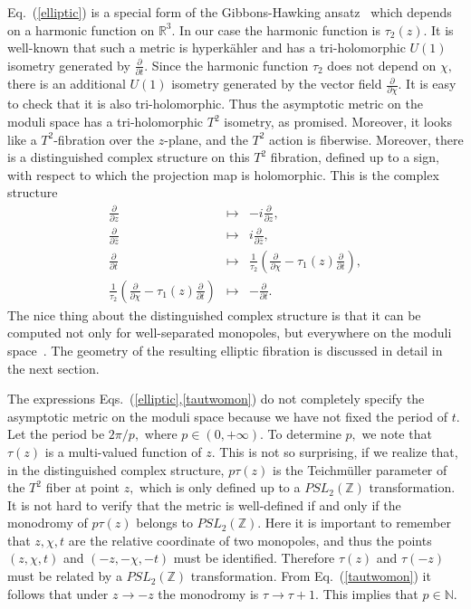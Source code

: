 \documentclass[a4paper,12pt, amsfonts, amssymb]{article}
\newcommand{\RR}{{\mathbb R}}
\newcommand{\ZZ}{{\mathbb Z}}
\newcommand{\NN}{{\mathbb N}}
\newcommand{\ra}{\rightarrow}
\newcommand{\nn}{\nonumber}
\newcommand{\bz}{{\bar z}}
\begin{document}
Eq.~(\ref{elliptic}) is a special form of the Gibbons-Hawking ansatz~\cite{GH}
which depends on a harmonic function on $\RR^3$. In our case the
harmonic function is $\tau_2(z)$. It is well-known that such a metric
is hyperk\"ahler and has a tri-holomorphic $U(1)$ isometry generated
by $\frac{\partial}{\partial t}.$ Since the harmonic function $\tau_2$
does not depend on $\chi,$ there is an additional $U(1)$ isometry generated
by the vector field $\frac{\partial}{\partial \chi}.$ It is easy to check
that it is also tri-holomorphic. Thus the asymptotic metric on the moduli
space has a tri-holomorphic $T^2$ isometry, as promised. Moreover, it looks
like a $T^2$-fibration over the $z$-plane, and the $T^2$ action is
fiberwise. Moreover, there is a distinguished complex structure on this
$T^2$ fibration, defined up to a sign, with respect to which the projection
map is holomorphic. This is the complex structure
\begin{eqnarray}\label{disting}
\frac{\partial}{\partial z}&\mapsto &-i\frac{\partial}{\partial z},\\ \nn
\frac{\partial}{\partial\bz}&\mapsto & i\frac{\partial}{\partial\bz},\\ \nn
\frac{\partial}{\partial t}&\mapsto & \frac{1}{\tau_2}\left(
\frac{\partial}{\partial\chi}-\tau_1(z)\frac{\partial}{\partial t}\right),\\
\frac{1}{\tau_2}\left(\frac{\partial}{\partial\chi}-
\tau_1(z)\frac{\partial}{\partial t}\right) &\mapsto &
-\frac{\partial}{\partial t}.\nn
\end{eqnarray}
The nice thing about the distinguished complex structure is that it can
be computed not only for well-separated monopoles, but everywhere on the
moduli space~\cite{usone}. The geometry of the resulting elliptic fibration
is discussed in detail in the next section.

The expressions Eqs.~(\ref{elliptic},\ref{tautwomon}) do not completely specify the asymptotic metric on the moduli space because we have not fixed the period of $t.$
Let the period be $2\pi/p,$ where $p\in (0,+\infty).$ To determine $p,$
we note that $\tau(z)$ is a multi-valued function of $z.$ This is not
so surprising, if we realize that, in the distinguished complex structure,
$p\tau(z)$ is the Teichm\"uller parameter of the $T^2$ fiber at point $z,$
which is only defined up to a $PSL_2(\ZZ)$ transformation. It is not hard to
verify that the metric is well-defined if and only if the monodromy of
$p\tau(z)$ belongs to $PSL_2(\ZZ).$
Here it is important to remember that $z,\chi,t$ are the relative coordinate
of two monopoles, and thus the points $(z,\chi,t)$ and $(-z,-\chi,-t)$
must be identified. Therefore $\tau(z)$ and $\tau(-z)$ must
be related by a $PSL_2(\ZZ)$ transformation. From Eq.~(\ref{tautwomon})
it follows that under $z\ra -z$ the monodromy is $\tau\ra\tau +1.$
This implies that $p\in\NN.$
\end{document}
